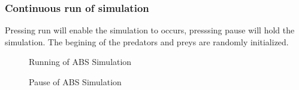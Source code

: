 \documentclass{article}
\begin{document}
\begin{normalsize}
\subsubsection{Continuous run of simulation}
Pressing run will enable the simulation to occurs, presssing pause will hold the simulation. The begining of the predators and preys are randomly initialized.
\begin{figure}[H]
	\caption{Running of ABS Simulation}
\end{figure}
\begin{figure}[H]
	\caption{Pause of ABS Simulation}
	\end{figure}


\end{normalsize}
\end{document}

